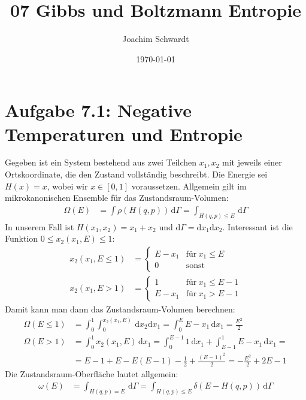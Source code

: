 \documentclass[a4paper,12pt]{article}
\newcommand{\intx}{}
\newcommand{\klam}{}
\newcommand{\tecxt}{}
\begin{document}
\title{07 Gibbs und Boltzmann Entropie}
\author{Joachim Schwardt}
\date{\today}
\maketitle

\section*{Aufgabe 7.1: Negative Temperaturen und Entropie}
Gegeben ist ein System bestehend aus zwei Teilchen $x_1,x_2$ mit jeweils einer Ortskoordinate, die den Zustand vollständig beschreibt. Die Energie sei $H(x)=x$, wobei wir $x\in\klam\left[ {0,1} \right]$ voraussetzen. Allgemein gilt im mikrokanonischen Ensemble für das Zustandsraum-Volumen:
\begin{align*}
\Omega(E)&=\int\rho(H(q,p))\,\mathrm{d}\Gamma=\int_{H(q,p)\le E}\,\mathrm{d}\Gamma
\end{align*} 
In unserem Fall ist $H(x_1,x_2)=x_1+x_2$ und $\mathrm{d}\Gamma=\mathrm{d}x_1\mathrm{d}x_2$. Interessant ist die Funktion $0\le x_2(x_1,E)\le 1$:
\begin{align*}
x_2(x_1,E\le 1)&=\left\{\begin{matrix}
E-x_1 & \tecxt\text{für}\ x_1\le E \\ 0 &\tecxt\text{sonst}
\end{matrix}\right.\\
x_2(x_1,E>1)&=\left\{\begin{matrix}
1&\tecxt\text{für}\ x_1\le E-1 \\ 
E-x_1&\tecxt\text{für}\ x_1>E-1
\end{matrix}\right.
\end{align*}
Damit kann man dann das Zustandsraum-Volumen berechnen:
\begin{align*}
\Omega(E\le 1)&=\intx\int_{0}^{1}\intx\int_{0}^{x_2(x_1,E)}\,\mathrm{d}x_2\mathrm{d}x_1=\intx\int_{0}^{E}E-x_1\,\mathrm{d}x_1=\frac{E^2}{2}\\
\Omega(E>1)&=\intx\int_{0}^{1}x_2(x_1,E)\,\mathrm{d}x_1=\intx\int_{0}^{E-1}1\,\mathrm{d}x_1+\intx\int_{E-1}^{1}E-x_1\,\mathrm{d}x_1=\\
&=E-1+E-E(E-1)-\frac{1}{2}+\frac{(E-1)^2}{2}=-\frac{E^2}{2}+2E-1
\end{align*}
Die Zustandsraum-Oberfläche lautet allgemein:
\begin{align*}
\omega(E)&=\int_{H(q,p)= E}\,\mathrm{d}\Gamma=\int_{H(q,p)\le E}\delta(E-H(q,p))\,\mathrm{d}\Gamma
\end{align*} 
\end{document}
